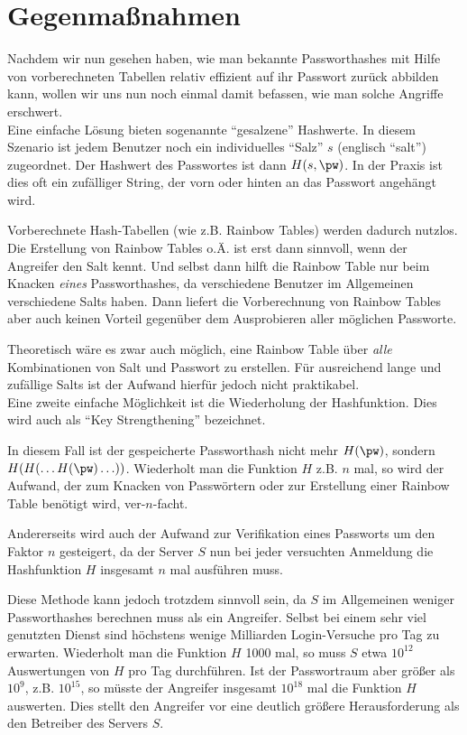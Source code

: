 \section{Gegenmaßnahmen}

Nachdem wir nun gesehen haben, wie man bekannte Passworthashes mit Hilfe von vorberechneten Tabellen relativ effizient auf ihr Passwort zurück abbilden kann, wollen wir uns nun noch einmal damit befassen, wie man solche Angriffe erschwert.\\

Eine einfache Lösung bieten sogenannte "`gesalzene"' Hashwerte. In diesem Szenario ist jedem Benutzer noch ein individuelles "`Salz"' $s$ (englisch "`salt"') zugeordnet. Der Hashwert des Passwortes ist dann $H(s, \pw)$. In der Praxis ist dies oft ein zufälliger String, der vorn oder hinten an das Passwort angehängt wird.

Vorberechnete Hash-Tabellen (wie z.B. Rainbow Tables) werden dadurch nutzlos. Die Erstellung von Rainbow Tables o.Ä. ist erst dann sinnvoll, wenn der Angreifer den Salt kennt. Und selbst dann hilft die Rainbow Table nur beim Knacken \emph{eines} Passworthashes, da verschiedene Benutzer im Allgemeinen verschiedene Salts haben. Dann liefert die Vorberechnung von Rainbow Tables aber auch keinen Vorteil gegenüber dem Ausprobieren aller möglichen Passworte.

Theoretisch wäre es zwar auch möglich, eine Rainbow Table über \emph{alle} Kombinationen von Salt und Passwort zu erstellen. Für ausreichend lange und zufällige Salts ist der Aufwand hierfür jedoch nicht praktikabel.\\

Eine zweite einfache Möglichkeit ist die Wiederholung der Hashfunktion. Dies wird auch als "`Key Strengthening"' bezeichnet.

In diesem Fall ist der gespeicherte Passworthash nicht mehr $H(\pw)$, sondern $H(H(\ldots H(\pw)\ldots))$. Wiederholt man die Funktion $H$ z.B. $n$ mal, so wird der Aufwand, der zum Knacken von Passwörtern oder zur Erstellung einer Rainbow Table benötigt wird, ver-$n$-facht.

Andererseits wird auch der Aufwand zur Verifikation eines Passworts um den Faktor $n$ gesteigert, da der Server $S$ nun bei jeder versuchten Anmeldung die Hashfunktion $H$ insgesamt $n$ mal ausführen muss.

Diese Methode kann jedoch trotzdem sinnvoll sein, da $S$ im Allgemeinen weniger Passworthashes berechnen muss als ein Angreifer. Selbst bei einem sehr viel genutzten Dienst sind höchstens wenige Milliarden Login-Versuche pro Tag zu erwarten. Wiederholt man die Funktion $H$ 1000 mal, so muss $S$ etwa $10^{12}$ Auswertungen von $H$ pro Tag durchführen. Ist der Passwortraum aber größer als $10^9$, z.B. $10^{15}$, so müsste der Angreifer insgesamt $10^{18}$ mal die Funktion $H$ auswerten. Dies stellt den Angreifer vor eine deutlich größere Herausforderung als den Betreiber des Servers $S$.

